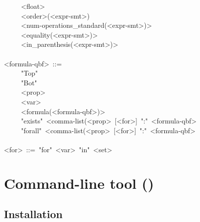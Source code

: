 \begin{mdpre}
~~~~\textbar{}~{\textless{}float\textgreater{}}\\
~~~~\textbar{}~{\textless{}order\textgreater{}(\textless{}expr-smt\textgreater{}})\\
~~~~\textbar{}~\textless{}num-operations\_standard({\textless{}expr-smt\textgreater{})\textgreater{}}\\
~~~~\textbar{}~{\textless{}equality(\textless{}expr-smt\textgreater{})\textgreater{}}\\
~~~~\textbar{}~\textless{}in\_parenthesis({\textless{}expr-smt\textgreater{})\textgreater{}}\\
\\
{\textless{}formula-qbf\textgreater{}}~::=\\
~~~~\textbar{}~"Top"\\
~~~~\textbar{}~"Bot"\\
~~~~\textbar{}~{\textless{}prop\textgreater{}}\\
~~~~\textbar{}~{\textless{}var\textgreater{}}\\
~~~~\textbar{}~{\textless{}formula(\textless{}formula-qbf\textgreater{})\textgreater{}}\\
~~~~\textbar{}~"exists"~{\textless{}comma-list(\textless{}prop\textgreater{}}~{}[{\textless{}for\textgreater{}}]~":"~{\textless{}formula-qbf\textgreater{}}\\
~~~~\textbar{}~"forall"~{\textless{}comma-list(\textless{}prop\textgreater{}}~{}[{\textless{}for\textgreater{}}]~":"~{\textless{}formula-qbf\textgreater{}}\\
\\
{\textless{}for\textgreater{}}~::=~"for"~{\textless{}var\textgreater{}}~"in"~{\textless{}set\textgreater{}}%
\end{mdpre}
\section{Command-line tool ()}\label{touist-program}%

\subsection{Installation}\label{sec-installation}%

